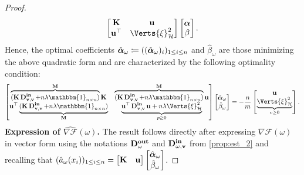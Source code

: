 \begin{proof}
\begin{align*}
\begin{bmatrix}
        \K & \mathbf{u}\\
        \mathbf{u}^{\top} & \Verts{\xi}^2_\mathcal{H}
    \end{bmatrix}\begin{bmatrix}
        \alphabf\\
        \beta
    \end{bmatrix}.
\end{align*}
Hence, the optimal coefficients $\hat{\operatorname{\boldsymbol{\alpha}}}_{\omega}\coloneqq ((\hat{\operatorname{\boldsymbol{\alpha}}}_{\omega})_{i})_{1\leq i \leq n}$ and  $\hat{\beta}_{\omega}$  are those minimizing the above quadratic form and are characterized by the following optimality condition:
\begin{equation*}
\begin{bmatrix}
    \overbrace{(\K\Dtwo + n\lambda\mathbbm{1}_{n\times n})}^{\M}\K & \overbrace{(\K\Dtwo + n\lambda\mathbbm{1}_{n\times n})}^{\M}\mathbf{u}\\
    \mathbf{u}^{\top}\underbrace{(\K\Dtwo + n\lambda\mathbbm{1}_{n\times n})}_{\M} &  \underbrace{\mathbf{u}^{\top}\Dtwo\mathbf{u} + n\lambda \Verts{\xi}^{2}_{\mathcal{H}}}_{p\geq 0}
\end{bmatrix}\begin{bmatrix}
        \hat{\alphabf}_\omega\\
        \hat{\beta}_\omega
    \end{bmatrix}= - \frac{n}{m}\begin{bmatrix}
        \mathbf{u}\\
 	\underbrace{\Verts{\xi}^2_{\mathcal{H}}}_{v\geq 0}
    \end{bmatrix}.
\end{equation*}
{\bf Expression of $\widehat{\nabla\mathcal{F}}(\omega)$.}
The result follows directly after expressing $\widehat{\nabla\mathcal{F}}(\omega)$ in vector form using the notations $\operatorname{\mathbf{D_\omega^{out}}}$ and $\operatorname{\mathbf{D_{\omega,v}^{in}}}$ from \cref{prop:est_2} and recalling that $(\hat{a}_{\omega}(x_i))_{1\leq i\leq n} = \begin{bmatrix}
        \operatorname{\mathbf{K}} & 
        \mathbf{u}
    \end{bmatrix}\begin{bmatrix}
        \hat{\operatorname{\boldsymbol{\alpha}}}_{\omega}\\
        \hat{\beta}_{\omega}
    \end{bmatrix}$.
\end{proof}


